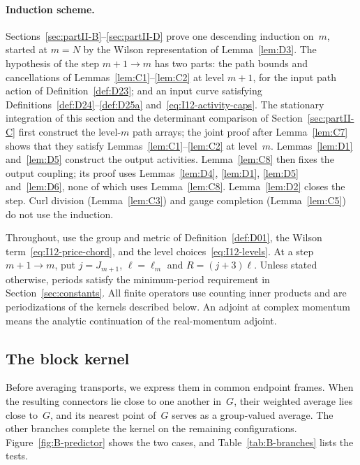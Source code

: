 \paragraph{Induction scheme.}
Sections~\ref{sec:partII-B}--\ref{sec:partII-D} prove one descending induction on~$m$, started at $m=N$ by the Wilson representation of Lemma~\ref{lem:D3}. The hypothesis of the step $m+1\to m$ has two parts: the path bounds and cancellations of Lemmas~\ref{lem:C1}--\ref{lem:C2} at level $m+1$, for the input path action of Definition~\ref{def:D23}; and an input curve satisfying Definitions~\ref{def:D24}--\ref{def:D25a} and~\eqref{eq:I12-activity-caps}. The stationary integration of this section and the determinant comparison of Section~\ref{sec:partII-C} first construct the level-$m$ path arrays; the joint proof after Lemma~\ref{lem:C7} shows that they satisfy Lemmas~\ref{lem:C1}--\ref{lem:C2} at level~$m$. Lemmas~\ref{lem:D1} and~\ref{lem:D5} construct the output activities. Lemma~\ref{lem:C8} then fixes the output coupling; its proof uses Lemmas~\ref{lem:D4}, \ref{lem:D1}, \ref{lem:D5} and~\ref{lem:D6}, none of which uses Lemma~\ref{lem:C8}. Lemma~\ref{lem:D2} closes the step. Curl division (Lemma~\ref{lem:C3}) and gauge completion (Lemma~\ref{lem:C5}) do not use the induction.

Throughout, use the group and metric of Definition~\ref{def:D01}, the Wilson term~\eqref{eq:I12-price-chord}, and the level choices~\eqref{eq:I12-levels}. At a step $m+1\to m$, put $j=J_{m+1}$, $\ell=\ell_m$ and $R=(j+3)\ell$. Unless stated otherwise, periods satisfy the minimum-period requirement in Section~\ref{sec:constants}. All finite operators use counting inner products and are periodizations of the kernels described below. An adjoint at complex momentum means the analytic continuation of the real-momentum adjoint.

\subsection{The block kernel}\label{subsec:B-kernel}

Before averaging transports, we express them in common endpoint frames. When the resulting connectors lie close to one another in~$G$, their weighted average lies close to~$G$, and its nearest point of~$G$ serves as a group-valued average. The other branches complete the kernel on the remaining configurations. Figure~\ref{fig:B-predictor} shows the two cases, and Table~\ref{tab:B-branches} lists the tests.

